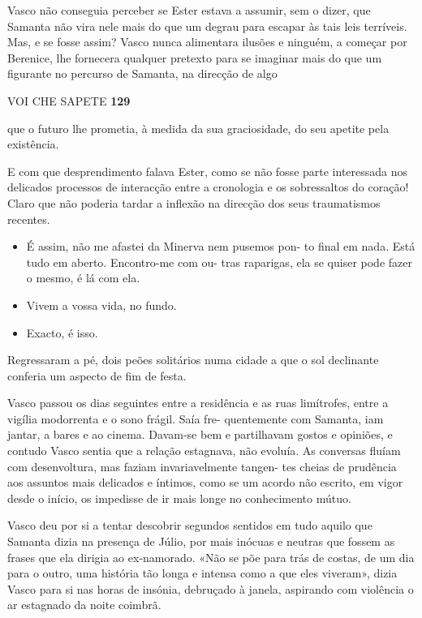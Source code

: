 Vasco não conseguia perceber se Ester estava a assumir, sem o dizer, que
Samanta não vira nele mais do que um degrau para escapar às tais leis
terríveis. Mas, e se fosse assim? Vasco nunca alimentara ilusões e
ninguém, a começar por Berenice, lhe fornecera qualquer pretexto para se
imaginar mais do que um figurante no percurso de Samanta, na direcção de
algo

VOI CHE SAPETE \textbf{129}

que o futuro lhe prometia, à medida da sua graciosidade, do seu apetite
pela existência.

E com que desprendimento falava Ester, como se não fosse parte
interessada nos delicados processos de interacção entre a cronologia e
os sobressaltos do coração! Claro que não poderia tardar a inflexão na
direcção dos seus traumatismos recentes.

\begin{itemize}
\tightlist
\item
  É assim, não me afastei da Minerva nem pusemos pon- to final em nada.
  Está tudo em aberto. Encontro-me com ou- tras raparigas, ela se quiser
  pode fazer o mesmo, é lá com ela.
\item
  Vivem a vossa vida, no fundo.
\item
  Exacto, é isso.
\end{itemize}

Regressaram a pé, dois peões solitários numa cidade a que o sol
declinante conferia um aspecto de fim de festa.

Vasco passou os dias seguintes entre a residência e as ruas limítrofes,
entre a vigília modorrenta e o sono frágil. Saía fre- quentemente com
Samanta, iam jantar, a bares e ao cinema. Davam-se bem e partilhavam
gostos e opiniões, e contudo Vasco sentia que a relação estagnava, não
evoluía. As conversas fluíam com desenvoltura, mas faziam
invariavelmente tangen- tes cheias de prudência aos assuntos mais
delicados e íntimos, como se um acordo não escrito, em vigor desde o
início, os impedisse de ir mais longe no conhecimento mútuo.

Vasco deu por si a tentar descobrir segundos sentidos em tudo aquilo que
Samanta dizia na presença de Júlio, por mais inócuas e neutras que
fossem as frases que ela dirigia ao ex-namorado. «Não se põe para trás
de costas, de um dia para o outro, uma história tão longa e intensa como
a que eles viveram», dizia Vasco para si nas horas de insónia, debruçado
à janela, aspirando com violência o ar estagnado da noite coimbrã.

